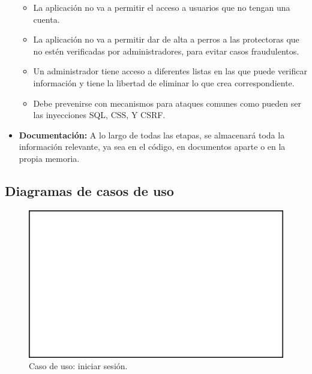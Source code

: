 \documentclass[a4paper, 12pt]{article}
\begin{document}
\begin{itemize}[noitemsep]
\begin{itemize}[noitemsep]
			\item La aplicación no va a permitir el acceso a usuarios que no tengan una cuenta.
			\item La aplicación no va a permitir dar de alta a perros a las protectoras que no estén verificadas por administradores, para evitar casos fraudulentos.
			\item Un administrador tiene acceso a diferentes listas en las que puede verificar información y tiene la libertad de eliminar lo que crea correspondiente.
			\item Debe prevenirse con mecanismos para ataques comunes como pueden ser las inyecciones SQL, CSS, Y CSRF. 
		\end{itemize}
	\item \textbf{Documentación:} A lo largo de todas las etapas, se almacenará toda la información relevante, ya sea en el código, en documentos aparte o en la propia memoria.
\end{itemize}

\subsection{Diagramas de casos de uso}


\begin{figure}[H]
	\begin{center}
		{\includegraphics[width=12cm]{White.png}\par}
		\caption{Caso de uso: iniciar sesión.}
	\end{center}
\end{figure}
\end{document}
